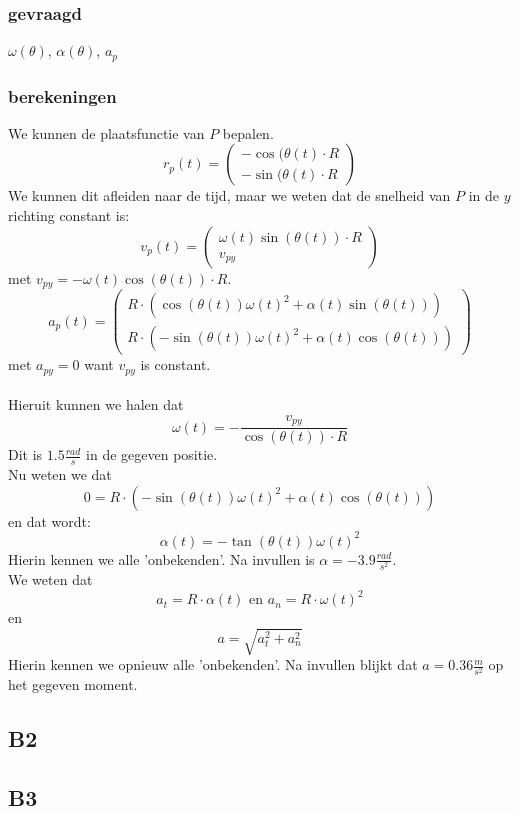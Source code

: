\documentclass[10pt,a4paper]{article}
\begin{document}
\subsubsection*{gevraagd}
$\omega(\theta)$, $\alpha(\theta)$, $a_{p}$
\subsubsection*{berekeningen}
We kunnen de plaatsfunctie van $P$ bepalen.
\[
r_{p}(t)=
\begin{pmatrix}
-\cos{(\theta(t)}\cdot R\\
-\sin{(\theta(t)}\cdot R
\end{pmatrix}
\] 
We kunnen dit afleiden naar de tijd, maar we weten dat de snelheid van $P$ in de $y$ richting constant is:
\[
v_{p}(t)=
\begin{pmatrix}
\omega(t)\sin{(\theta(t))}\cdot R\\
v_{py}
\end{pmatrix}
\]
met $v_{py} = -\omega(t)\cos{(\theta(t))}\cdot R$.
\[
a_{p}(t)=
\begin{pmatrix}
R\cdot(\cos{(\theta(t))}\omega(t)^{2} + \alpha(t)\sin{(\theta(t))})\\
R\cdot(-\sin{(\theta(t))}\omega(t)^{2} + \alpha(t)\cos{(\theta(t))})
\end{pmatrix}
\]
met $a_{py} = 0$ want $v_{py}$ is constant.
\\\\
Hieruit kunnen we halen dat 
\[
\omega(t) = -\frac{v_{py}}{\cos{(\theta(t))}\cdot R}
\]
Dit is $1.5 \frac{rad}{s}$ in de gegeven positie.\\
Nu weten we dat
\[
0=R\cdot(-\sin{(\theta(t))}\omega(t)^{2} + \alpha(t)\cos{(\theta(t))})
\]
en dat wordt:
\[
\alpha(t) = -\tan{(\theta(t))}\omega(t)^{2}
\]
Hierin kennen we alle 'onbekenden'. Na invullen is $\alpha = -3.9\frac{rad}{s^{2}}$.\\
We weten dat
\[
a_{t} = R\cdot\alpha(t) \text{ en } a_{n} = R\cdot \omega(t)^{2}
\]
en
\[
a = \sqrt{a_{t}^{2} + a_{n}^{2}}
\]
Hierin kennen we opnieuw alle 'onbekenden'. Na invullen blijkt dat $a=0.36\frac{m}{s^{2}}$ op het gegeven moment.

\subsection{B2}

\subsection{B3}
\end{document}
